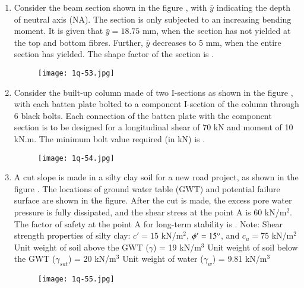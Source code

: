 \documentclass[journal,12pt,onecolumn]{article}
\theoremstyle{remark}
\begin{document}
\begin{enumerate}
\hfill{}

\item Consider the beam section shown in the figure , with $\bar{y}$ indicating the depth of neutral axis (NA). The section is only subjected to an increasing bending moment. It is given that $\bar{y} = 18.75$ mm, when the section has not yielded at the top and bottom fibres. Further, $\bar{y}$ decreases to 5 mm, when the entire section has yielded. The shape factor of the section is \underline{\hspace{2cm}} .
\begin{figure}[H]
    \centering
    \texttt{[image: 1q-53.jpg]}
    \caption{}
    \label{fig:q53}
\end{figure}

\hfill{}

\item Consider the built-up column made of two I-sections as shown in the figure , with each batten plate bolted to a component I-section of the column through 6 black bolts. Each connection of the batten plate with the component section is to be designed for a longitudinal shear of 70 kN and moment of 10 kN.m. The minimum bolt value required (in kN) is \underline{\hspace{2cm}} .
\begin{figure}[H]
    \centering
    \texttt{[image: 1q-54.jpg]}
    \caption{}
    \label{fig:q54}
\end{figure}

\hfill{}

\item A cut slope is made in a silty clay soil for a new road project, as shown in the figure . The locations of ground water table (GWT) and potential failure surface are shown in the figure. After the cut is made, the excess pore water pressure is fully dissipated, and the shear stress at the point A is 60 kN/m$^2$. The factor of safety at the point A for long-term stability is \underline{\hspace{2cm}} .
Note:
Shear strength properties of silty clay: $c' = 15$ kN/m$^2$, $\phi' = 15\degree$, and $c_u = 75$ kN/m$^2$
Unit weight of soil above the GWT ($\gamma$) = 19 kN/m$^3$
Unit weight of soil below the GWT ($\gamma_{sat}$) = 20 kN/m$^3$
Unit weight of water ($\gamma_w$) = 9.81 kN/m$^3$
\begin{figure}[H]
    \centering
    \texttt{[image: 1q-55.jpg]}
    \caption{}
    \label{fig:q55}
\end{figure}


\end{enumerate}
\end{document}
